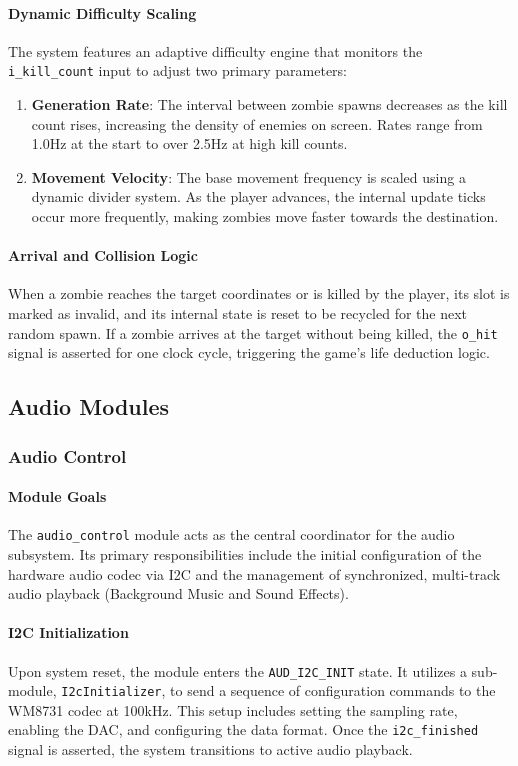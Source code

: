 \documentclass[12pt,a4paper]{article}
\begin{document}
\paragraph{Dynamic Difficulty Scaling}
The system features an adaptive difficulty engine that monitors the \texttt{i\_kill\_count} input to adjust two primary parameters:
\begin{enumerate}
    \item \textbf{Generation Rate}: The interval between zombie spawns decreases as the kill count rises, increasing the density of enemies on screen. Rates range from 1.0Hz at the start to over 2.5Hz at high kill counts.
    \item \textbf{Movement Velocity}: The base movement frequency is scaled using a dynamic divider system. As the player advances, the internal update ticks occur more frequently, making zombies move faster towards the destination.
\end{enumerate}

\paragraph{Arrival and Collision Logic}
When a zombie reaches the target coordinates or is killed by the player, its slot is marked as invalid, and its internal state is reset to be recycled for the next random spawn. If a zombie arrives at the target without being killed, the \texttt{o\_hit} signal is asserted for one clock cycle, triggering the game's life deduction logic.

\subsection{Audio Modules}
\subsubsection{Audio Control}

\paragraph{Module Goals}
The \texttt{audio\_control} module acts as the central coordinator for the audio subsystem. Its primary responsibilities include the initial configuration of the hardware audio codec via I2C and the management of synchronized, multi-track audio playback (Background Music and Sound Effects).

\paragraph{I2C Initialization}
Upon system reset, the module enters the \texttt{AUD\_I2C\_INIT} state. It utilizes a sub-module, \texttt{I2cInitializer}, to send a sequence of configuration commands to the WM8731 codec at 100kHz. This setup includes setting the sampling rate, enabling the DAC, and configuring the data format. Once the \texttt{i2c\_finished} signal is asserted, the system transitions to active audio playback.
\end{document}
